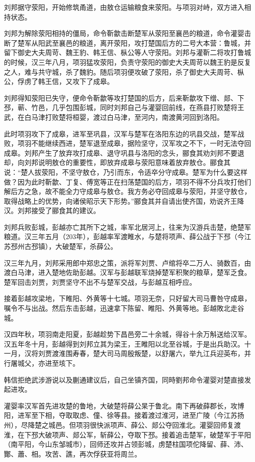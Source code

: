 刘邦据守荥阳，开始修筑甬道，由敖仓运输粮食来荥阳。与项羽对峙，双方进入相持状态。

刘邦为解除荥阳相持的僵局，命令靳歙击断楚军从荥阳至襄邑的粮道，命令灌婴击断了楚军从阳武至襄邑的粮道，离开荥阳，攻打楚国后方的二号大本营：鲁城，并留下御史大夫周苛、魏王豹、韩王信、枞公等人守荥阳。刘邦与灌靳二将攻打鲁城的时候，汉三年八月，项羽猛攻荥阳，负责守荥阳的御史大夫周苛以魏王豹是反复之人，难与共守城，杀了魏豹。随后项羽便攻破了荥阳，杀了御史大夫周苛、枞公，俘虏了韩王信，又攻下了成皋。

刘邦得知荥阳已失守，便命令靳歙等攻打楚国的后方，后来靳歙攻下缯、郯、下邳，蕲、竹邑，几乎包围彭城，同时刘邦自己与灌婴回前线，在燕县打败楚将王武，在白马津打败楚将桓婴，渡过白马津，至河内，南渡黄河回到洛阳。

此时项羽攻下了成皋，进军至巩县，汉军与楚军在洛阳东边的巩县交战，楚军战败，项羽不能继续西进，楚军退至成皋，据险坚守，汉军攻之不下，一时无法夺回成皋。刘邦产生了放弃攻打成皋、退守巩县与洛阳的念头，郦食其劝刘邦不要退却，向刘邦说明敖仓的重要性，即放弃成皋与荥阳意味着放弃敖仓。郦食其说：“楚人拔荥阳，不坚守敖仓，乃引而东，令适卒分守成皋。楚军为什么要这样做？因为此时靳歙、丁复、傅宽等正在扫荡楚国的后方，项羽不得不分兵攻打他们解后方之急，故不能全力守成皋与敖仓。我方务必夺回成皋与荥阳，并坚守敖仓，取得战略上的优势，向诸侯昭示天下形势。”郦食其并自请出使齐国，劝说齐王降汉。刘邦接受了郦食其的建议。

刘邦兵败彭城，彭越亦亡其所下之城，率军北居河上，往来为汉游兵击楚，绝楚军粮道。汉三年五月（203年），彭越率军渡睢水，与楚将项声、薛公战于下邳（今江苏邳州古邳镇），大破楚军，杀薛公。

汉三年九月，刘邦采用郎中郑忠之策，派将军刘贾、卢绾将卒二万人、骑数百，由渡白马津，进入楚地佐助彭越。汉军与彭越联军烧掉楚军积聚的粮草，楚军乏食。楚军回击刘贾，刘贾坚守不出不与楚军交战，与彭越互相呼应。

接着彭越攻梁地，下睢阳、外黄等十七城。项羽无奈，只好留大司马曹咎守成皋，嘱令不与出战。然后东击彭越，迅速拿下陈留、睢阳、外黄等地。彭越敗北走谷城。

汉四年秋，项羽南走阳夏，彭越趁势下昌邑旁二十余城，得谷十余万斛送给汉军。汉五年冬十月，彭越得到刘邦立其为梁王，王睢阳以北至谷城，于是出兵助汉。十一月，汉将刘贾渡淮围寿春，楚大司马周殷叛楚，以舒屠六，举九江兵迎英布，并行屠城父，亦进至垓下。

韩信拒绝武涉游说以及蒯通建议后，自己坐镇齐国，同時劉邦命令灌婴对楚直接发起进攻。

灌婴率汉军首先进攻楚的鲁地，大破楚将薛公杲于鲁北。南下再破薛郡长，攻博阳，进军至下相，夺取取虑、僮、徐等县。接着渡过淮河，进至广陵（今江苏扬州），尽降楚之城邑。但项羽很快派项声、薛公、郯公夺回淮北。灌婴回师复渡淮，在下邳大破项声、郯公军，斩薛公，夺取下邳。接着追击楚军，破楚军于平阳（南平阳，今山东邹城市），回师还攻并占领彭城，虏楚柱国项佗降留、薛、沛、酇、蕭、相。攻苦、譙，再次俘获亚将周兰。

